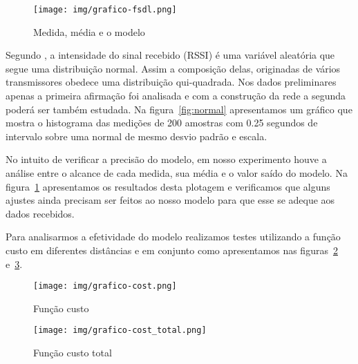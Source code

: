\begin{figure}[ht]
\centering
\texttt{[image: img/grafico-fsdl.png]}
\caption{Medida, média e o modelo \label{fig:fsdl}}
\end{figure}


Segundo \cite{Kaemarungsi2004}, a intensidade do sinal recebido (RSSI) é uma variável aleatória que segue uma distribuição normal. Assim a composição delas, originadas de vários transmissores obedece uma distribuição qui-quadrada. Nos dados preliminares apenas a primeira afirmação foi analisada e com a construção da rede a segunda poderá ser também estudada. Na figura~\ref{fig:normal} apresentamos um gráfico que mostra o histograma das medições de 200 amostras com 0.25 segundos de intervalo sobre uma normal de mesmo desvio padrão e escala.

No intuito de verificar a precisão do modelo, em nosso experimento houve a análise entre o alcance de cada medida, sua média e o valor saído do modelo. Na figura~\ref{fig:fsdl} apresentamos os resultados desta plotagem e verificamos que alguns ajustes ainda precisam ser feitos ao nosso modelo para que esse se adeque aos dados recebidos.

Para analisarmos a efetividade do modelo realizamos testes utilizando a função custo em diferentes distâncias e em conjunto como apresentamos nas figuras~\ref{fig:cost} e~\ref{fig:cost-total}.

\begin{figure}[ht]
\centering
	\texttt{[image: img/grafico-cost.png]}
	\caption{Função custo\label{fig:cost}}
\end{figure}
\begin{figure}[ht]
\centering
\texttt{[image: img/grafico-cost\_total.png]}
\caption{Função custo total\label{fig:cost-total}}
\end{figure}

%

